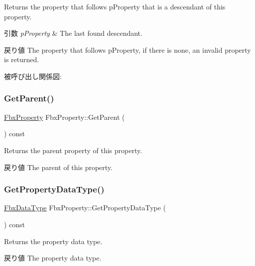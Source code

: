 Returns the property that follows p\+Property that is a descendant of this property. 
\begin{DoxyParams}{引数}
{\em p\+Property} & The last found descendant. \\
\hline
\end{DoxyParams}
\begin{DoxyReturn}{戻り値}
The property that follows p\+Property, if there is none, an invalid property is returned. 
\end{DoxyReturn}
被呼び出し関係図\+:
\mbox{\label{class_fbx_property_a2cafce5b279fd3dd3a01a618538c15ca}} 
\subsubsection{\texorpdfstring{Get\+Parent()}{GetParent()}}
{\footnotesize\ttfamily \hyperlink{class_fbx_property}{Fbx\+Property} Fbx\+Property\+::\+Get\+Parent (\begin{DoxyParamCaption}{ }\end{DoxyParamCaption}) const}

Returns the parent property of this property. \begin{DoxyReturn}{戻り値}
The parent of this property. 
\end{DoxyReturn}
\mbox{\label{class_fbx_property_a62565770177152f06d82c745e0811b84}} 
\subsubsection{\texorpdfstring{Get\+Property\+Data\+Type()}{GetPropertyDataType()}}
{\footnotesize\ttfamily \hyperlink{class_fbx_data_type}{Fbx\+Data\+Type} Fbx\+Property\+::\+Get\+Property\+Data\+Type (\begin{DoxyParamCaption}{ }\end{DoxyParamCaption}) const}

Returns the property data type. \begin{DoxyReturn}{戻り値}
The property data type. 
\end{DoxyReturn}
\mbox{\label{class_fbx_property_ac723c81393df4b2fdedd78863b361ab5}} 
